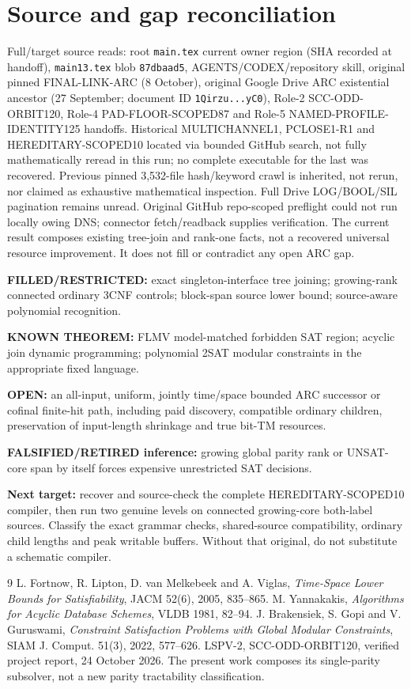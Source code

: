 \documentclass[11pt]{article}
\begin{document}
\section{Source and gap reconciliation}
Full/target source reads: root \texttt{main.tex} current owner region (SHA recorded at handoff), \texttt{main13.tex} blob \texttt{87dbaad5}, AGENTS/CODEX/repository skill, original pinned FINAL-LINK-ARC (8 October), original Google Drive ARC existential ancestor (27 September; document ID \texttt{1Qirzu...yC0}), Role-2 SCC-ODD-ORBIT120, Role-4 PAD-FLOOR-SCOPED87 and Role-5 NAMED-PROFILE-IDENTITY125 handoffs. Historical MULTICHANNEL1, PCLOSE1-R1 and HEREDITARY-SCOPED10 located via bounded GitHub search, not fully mathematically reread in this run; no complete executable for the last was recovered. Previous pinned 3,532-file hash/keyword crawl is inherited, not rerun, nor claimed as exhaustive mathematical inspection. Full Drive LOG/BOOL/SIL pagination remains unread. Original GitHub repo-scoped preflight could not run locally owing DNS; connector fetch/readback supplies verification. The current result composes existing tree-join and rank-one facts, not a recovered universal resource improvement. It does not fill or contradict any open ARC gap.
\par\noindent\textbf{FILLED/RESTRICTED:} exact singleton-interface tree joining; growing-rank connected ordinary 3CNF controls; block-span source lower bound; source-aware polynomial recognition.
\par\noindent\textbf{KNOWN THEOREM:} FLMV model-matched forbidden SAT region; acyclic join dynamic programming; polynomial 2SAT modular constraints in the appropriate fixed language.
\par\noindent\textbf{OPEN:} an all-input, uniform, jointly time/space bounded ARC successor or cofinal finite-hit path, including paid discovery, compatible ordinary children, preservation of input-length shrinkage and true bit-TM resources.
\par\noindent\textbf{FALSIFIED/RETIRED inference:} growing global parity rank or UNSAT-core span by itself forces expensive unrestricted SAT decisions.
\par\noindent\textbf{Next target:} recover and source-check the complete HEREDITARY-SCOPED10 compiler, then run two genuine levels on connected growing-core both-label sources. Classify the exact grammar checks, shared-source compatibility, ordinary child lengths and peak writable buffers. Without that original, do not substitute a schematic compiler.

\begin{thebibliography}{9}
 L. Fortnow, R. Lipton, D. van Melkebeek and A. Viglas, \emph{Time-Space Lower Bounds for Satisfiability}, JACM 52(6), 2005, 835--865.
 M. Yannakakis, \emph{Algorithms for Acyclic Database Schemes}, VLDB 1981, 82--94.
 J. Brakensiek, S. Gopi and V. Guruswami, \emph{Constraint Satisfaction Problems with Global Modular Constraints}, SIAM J. Comput. 51(3), 2022, 577--626.
 LSPV-2, SCC-ODD-ORBIT120, verified project report, 24 October 2026. The present work composes its single-parity subsolver, not a new parity tractability classification.
\end{thebibliography}
\end{document}
